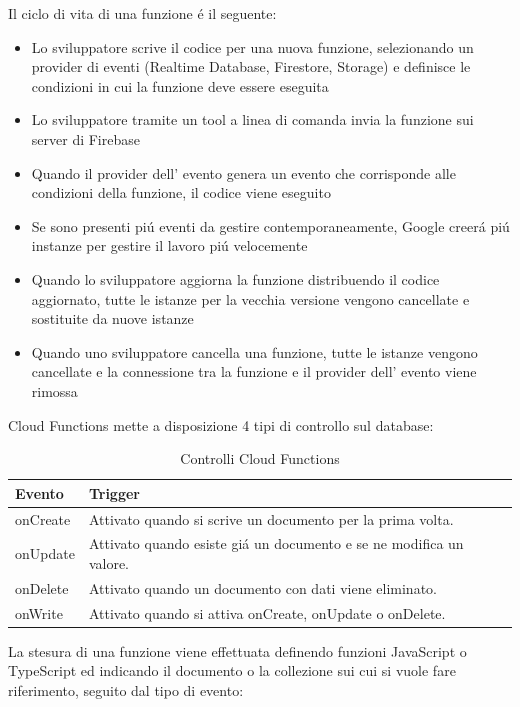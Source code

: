 Il ciclo di vita di una funzione \'e il seguente:
\begin{itemize}
  \item Lo sviluppatore scrive il codice per una nuova funzione, selezionando un provider di eventi (Realtime Database, Firestore, Storage) e definisce le condizioni in cui la funzione deve essere eseguita
  \item Lo sviluppatore tramite un tool a linea di comanda invia la funzione sui server di Firebase
  \item Quando il provider dell' evento genera un evento che corrisponde alle condizioni della funzione, il codice viene eseguito
  \item Se sono presenti pi\'u eventi da gestire contemporaneamente, Google creer\'a pi\'u instanze per gestire il lavoro pi\'u velocemente
  \item Quando lo sviluppatore aggiorna la funzione distribuendo il codice aggiornato, tutte le istanze per la vecchia versione vengono cancellate e sostituite da nuove istanze
  \item Quando uno sviluppatore cancella una funzione, tutte le istanze vengono cancellate e la connessione tra la funzione e il provider dell' evento viene rimossa
\end{itemize}


\newpage              %
Cloud Functions mette a disposizione 4 tipi di controllo sul database:

\begin{table}[h!]
\begin{tabular}{|p{2cm}|p{12cm}|}
    \hline
    \textbf{Evento} & \textbf{Trigger} \\ \hline
    onCreate & Attivato quando si scrive un documento per la prima volta.\\ \hline
    onUpdate & Attivato quando esiste gi\'a un documento e se ne modifica un valore.\\ \hline
    onDelete & Attivato quando un documento con dati viene eliminato.\\ \hline
    onWrite & Attivato quando si attiva onCreate, onUpdate o onDelete.\\ \hline

\end{tabular}
\caption[Firestore Rules]{Controlli Cloud Functions}\label{tab:Controlli Cloud Functions}
\end{table}


La stesura di una funzione viene effettuata definendo funzioni JavaScript o TypeScript ed indicando il documento o la collezione sui cui si vuole fare riferimento, seguito dal tipo di evento:



